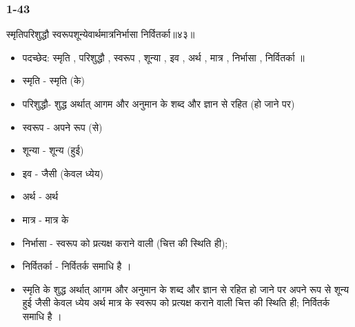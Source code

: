 \begin{frame}[fragile]\frametitle{1-43}
\begin{sanskrit}
स्मृतिपरिशुद्धौ स्वरूपशून्येवार्थमात्रनिर्भासा निर्वितर्का॥४३॥
\end{sanskrit}

	\begin{itemize}
	\item पदच्छेद: स्मृति , परिशुद्धौ , स्वरूप , शून्या , इव , अर्थ , मात्र , निर्भासा , निर्वितर्का ॥
	\item स्मृति - स्मृति (के)
	\item परिशुद्धौ- शुद्ध अर्थात् आगम और अनुमान के शब्द और ज्ञान से रहित (हो जाने पर)
	\item स्वरूप - अपने रूप (से)
	\item शून्या - शून्य (हुई)
	\item इव - जैसी (केवल ध्येय)
	\item अर्थ - अर्थ
	\item मात्र - मात्र के
	\item निर्भासा - स्वरूप को प्रत्यक्ष कराने वाली (चित्त की स्थिति ही);
	\item निर्वितर्का - निर्वितर्क समाधि है ।
	\item स्मृति के शुद्ध अर्थात् आगम और अनुमान के शब्द और ज्ञान से रहित हो जाने पर अपने रूप से शून्य हुई जैसी केवल ध्येय अर्थ मात्र के स्वरूप को प्रत्यक्ष कराने वाली चित्त की स्थिति ही; निर्वितर्क समाधि है ।
	\end{itemize}
	
\end{frame}

